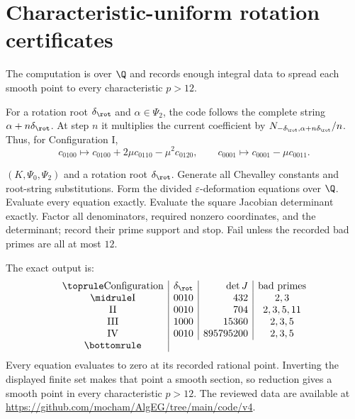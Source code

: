 \section{Characteristic-uniform rotation certificates}
\label{app:rotation-algorithm}

The computation is over $\Q$ and records enough integral data to spread each
smooth point to every characteristic $p>12$.

For a rotation root $\delta_{\rot}$ and $\alpha\in\Psi_2$, the code follows
the complete string $\alpha+n\delta_{\rot}$.  At step $n$ it multiplies the
current coefficient by
$N_{-\delta_{\rot},\alpha+n\delta_{\rot}}/n$.  Thus, for Configuration I,
\[
c_{0100}\mapsto c_{0100}+2\mu c_{0110}-\mu^2c_{0120},\qquad
c_{0001}\mapsto c_{0001}-\mu c_{0011}.
\]

\begin{tcolorbox}
\begin{algorithmic}[1]
\Require $(K,\Psi_0,\Psi_2)$ and a rotation root $\delta_{\rot}$.
\State Generate all Chevalley constants and root-string substitutions.
\State Form the divided $\varepsilon$-deformation equations over $\Q$.
  \State Evaluate every equation exactly.
  \State Evaluate the square Jacobian determinant exactly.
    \State Factor all denominators, required nonzero coordinates, and the
    determinant; record their prime support and stop.
  \EndIf
\EndFor
\State Fail unless the recorded bad primes are all at most $12$.
\end{algorithmic}
\end{tcolorbox}
\renewcommand{\figurename}{Algorithm}
\label{alg:rotation-certificate}

The exact output is:
\[
\begin{array}{c|c|r|c}
\toprule
\text{Configuration}&\delta_{\rot}&\det J&\text{bad primes}\\
\midrule
\mathrm{I}&0010&432&2,3\\
\mathrm{II}&0010&704&2,3,5,11\\
\mathrm{III}&1000&15360&2,3,5\\
\mathrm{IV}&0010&895795200&2,3,5\\
\bottomrule
\end{array}
\]
Every equation evaluates to zero at its recorded rational point.  Inverting
the displayed finite set makes that point a smooth section, so reduction gives
a smooth point in every characteristic $p>12$.  The reviewed data are
available at
\url{https://github.com/mocham/AlgEG/tree/main/code/v4}.
